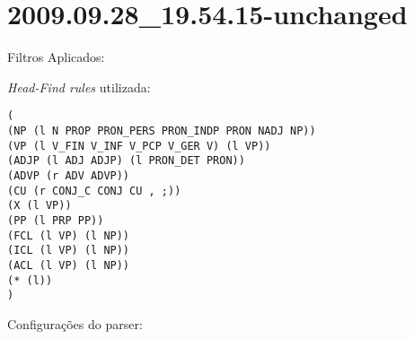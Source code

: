 \section{2009.09.28_19.54.15-unchanged} %
\label{sec:exp:2009.09.28_19.54.15-unchanged}

Filtros Aplicados:

\begin{itemize}
  
\end{itemize}

\emph{Head-Find rules} utilizada:

\scriptsize
\begin{verbatim}
(
(NP (l N PROP PRON_PERS PRON_INDP PRON NADJ NP))
(VP (l V_FIN V_INF V_PCP V_GER V) (l VP))
(ADJP (l ADJ ADJP) (l PRON_DET PRON))
(ADVP (r ADV ADVP))
(CU (r CONJ_C CONJ CU , ;))
(X (l VP))
(PP (l PRP PP))
(FCL (l VP) (l NP))
(ICL (l VP) (l NP))
(ACL (l VP) (l NP))
(* (l))
)

\end{verbatim}

\normalsize

Configurações do parser:

